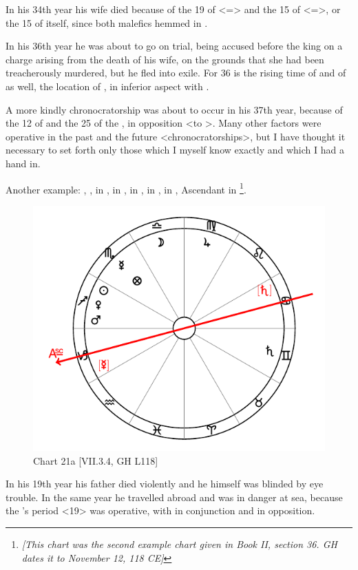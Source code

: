 In his 34th year his wife died because of the 19 of \Leo\xspace <=\Sun> and the 15 of \Scorpio\xspace <=\Mars>, or the 15 of \Mars\xspace itself, since both malefics hemmed in \Venus. 

In his 36th year he was about to go on trial, being accused before the king on a charge arising from the death of his wife, on the grounds that she had been treacherously murdered, but he fled into exile. For
36 is the rising time of \Leo\xspace and of \Scorpio\xspace as well, the location of \Venus, in inferior aspect with \Saturn. 

A more kindly chronocratorship was about to occur in his 37th year, because of the 12 of \Jupiter\xspace and the 25 of the \Moon, in opposition <to \Jupiter>. Many other factors were operative in the past and the future <chronocratorships>, but I have thought it necessary to set forth only those which I myself know exactly
and which I had a hand in.

\newpage
Another example: \Sun, \Mars, \Venus\xspace in \Sagittarius, \Moon\xspace in \Libra, \Saturn\xspace in \Gemini, \Jupiter\xspace in
\Virgo, \Mercury\xspace in \Scorpio, Ascendant in \Capricorn\footnote{\textit{[This chart was the second example chart given in Book II, section 36. GH dates it to November 12, 118 CE]}}.

\begin{figure}
\centering
\vspace{-20pt}
\includegraphics[width=.68\textwidth]{charts/2_36_2}
\caption{Chart 21a [VII.3.4, GH L118]}
\label{fig:chart21a}
\end{figure} 

In his 19th year his father died violently and he himself was blinded by eye trouble. In the same year he travelled abroad and was in danger at sea, because the \Sun’s period <19> was operative, with \Mars\xspace in conjunction and \Saturn in opposition. 

